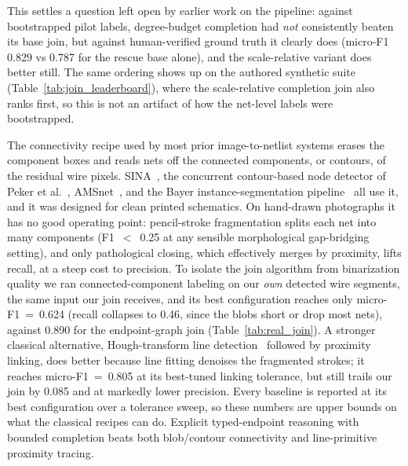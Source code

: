 \documentclass[journal]{IEEEtran}
\begin{document}
This settles a question left open by earlier work on the pipeline: against bootstrapped pilot labels, degree-budget completion had \emph{not} consistently beaten its base join, but against human-verified ground truth it clearly does (micro-F1 0.829 vs 0.787 for the rescue base alone), and the scale-relative variant does better still. The same ordering shows up on the authored synthetic suite (Table~\ref{tab:join_leaderboard}), where the scale-relative completion join also ranks first, so this is not an artifact of how the net-level labels were bootstrapped.

The connectivity recipe used by most prior image-to-netlist systems erases the component boxes and reads nets off the connected components, or contours, of the residual wire pixels. SINA~\cite{sina2026}, the concurrent contour-based node detector of Peker et al.~\cite{peker2026}, AMSnet~\cite{amsnet2025}, and the Bayer instance-segmentation pipeline~\cite{instanceseg2023} all use it, and it was designed for clean printed schematics. On hand-drawn photographs it has no good operating point: pencil-stroke fragmentation splits each net into many components (F1~$<$~0.25 at any sensible morphological gap-bridging setting), and only pathological closing, which effectively merges by proximity, lifts recall, at a steep cost to precision. To isolate the join algorithm from binarization quality we ran connected-component labeling on our \emph{own} detected wire segments, the same input our join receives, and its best configuration reaches only micro-F1~=~0.624 (recall collapses to 0.46, since the blobs short or drop most nets), against 0.890 for the endpoint-graph join (Table~\ref{tab:real_join}). A stronger classical alternative, Hough-transform line detection~\cite{duda1972hough} followed by proximity linking, does better because line fitting denoises the fragmented strokes; it reaches micro-F1~=~0.805 at its best-tuned linking tolerance, but still trails our join by 0.085 and at markedly lower precision. Every baseline is reported at its best configuration over a tolerance sweep, so these numbers are upper bounds on what the classical recipes can do. Explicit typed-endpoint reasoning with bounded completion beats both blob/contour connectivity and line-primitive proximity tracing.
\end{document}
